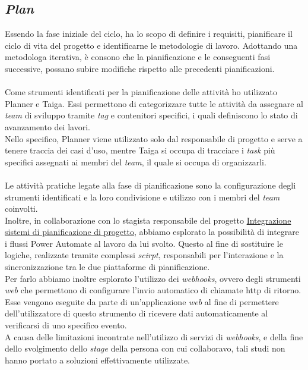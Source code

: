 \subsection{\emph{Plan}}
Essendo la fase iniziale del ciclo, ha lo scopo di definire i requisiti, pianificare il ciclo di vita del progetto e identificarne le metodologie di lavoro.
Adottando una metodologa iterativa, è consono che la pianificazione e le conseguenti fasi successive, possano subire modifiche rispetto alle precedenti pianificazioni.\\\\
Come strumenti identificati per la pianificazione delle attività ho utilizzato Planner e Taiga.
Essi permettono di categorizzare tutte le attività da assegnare al \emph{team} di sviluppo tramite \emph{tag} e contenitori specifici, i quali definiscono lo stato di avanzamento dei lavori.\\
Nello specifico, Planner viene utilizzato solo dal responsabile di progetto e serve a tenere traccia dei casi d'uso, mentre Taiga si occupa di tracciare i \emph{task} più specifici assegnati ai membri del \emph{team}, il quale si occupa di organizzarli.\\\\
Le attività pratiche legate alla fase di pianificazione sono la configurazione degli strumenti identificati e la loro condivisione e utilizzo con i membri del \emph{team} coinvolti.\\
Inoltre, in collaborazione con lo stagista responsabile del progetto \hyperref[stageGiacomo]{Integrazione sistemi di pianificazione di progetto}, abbiamo esplorato la possibilità di integrare i flussi Power Automate al lavoro da lui svolto.
Questo al fine di sostituire le logiche, realizzate tramite complessi \emph{scirpt}, responsabili per l'interazione e la sincronizzazione tra le due piattaforme di pianificazione.\\
Per farlo abbiamo inoltre esplorato l'utilizzo dei \emph{webhooks}, ovvero degli strumenti \emph{web} che permettono di configurare l'invio automatico di chiamate \gls{http} di ritorno.
Esse vengono eseguite da parte di un'applicazione \emph{web} al fine di permettere dell'utilizzatore di questo strumento di ricevere dati automaticamente al verificarsi di uno specifico evento.\\
A causa delle limitazioni incontrate nell'utilizzo di servizi di \emph{webhooks}, e della fine dello svolgimento dello \emph{stage} della persona con cui collaboravo, tali studi non hanno portato a soluzioni effettivamente utilizzate.



